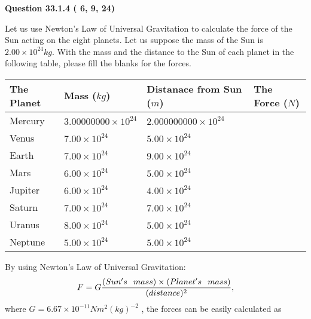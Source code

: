 \documentclass[12pt]{article}
\begin{document}
   
  
\vspace{0.2in}
  
{\textbf{\Large{Question
33.1.4 
 (          6,          9,         24)
}}}
  
  
Let us use Newton's Law of Universal Gravitation to calculate the force
of the Sun acting on the eight planets. Let us suppose the mass of the
Sun is $ %
2.00 \times 10^{24} kg$. With the mass and the
distance to the Sun of each planet in the following table, please fill
the blanks for the forces.
 
\vspace{0.2in}
 
 
\begin{tabular}{|l|l|l|l|}
\hline
The Planet & Mass ($kg$) & Distanace from Sun ($m$) & The Force ($N$)\\
\hline
Mercury  &
           $ %
3.00000000 \times 10^{24} $   &
             $ %
2.000000000 \times 10^{24} $    &
\\  \hline
Venus    &
           $ %
7.00 \times 10^{24} $    &
             $ %
5.00 \times 10^{24} $    &
\\  \hline
Earth    &
           $ %
7.00 \times 10^{24} $    &
             $ %
9.00 \times 10^{24} $    &
\\   \hline
Mars     &
           $ %
6.00 \times 10^{24} $    &
             $ %
5.00 \times 10^{24} $    &
\\   \hline
Jupiter  &
           $ %
6.00 \times 10^{24} $    &
             $ %
4.00 \times 10^{24} $    &
\\  \hline
Saturn   &
           $ %
7.00 \times 10^{24}$    &
             $ %
7.00 \times 10^{24}$    &
\\  \hline
Uranus   &
           $ %
8.00 \times 10^{24} $    &
             $ %
5.00 \times 10^{24} $    &
\\  \hline
Neptune  &
           $ %
5.00 \times 10^{24} $    &
             $ %
5.00 \times 10^{24} $    &
\\  \hline
 
\end{tabular}
 
 
 
 
\noindent{}
 
 

By using Newton's Law of Universal Gravitation:
\[
F=G \frac{(Sun's \hspace{0.1in} mass) \times (Planet's \hspace{0.1in} mass)} { (distance)^2},
\]
where
$ G= %
6.67 \times 10^{-11}N m^{2}(kg)^{-2}$ , the forces can be easily calculated as
 
\end{document}
